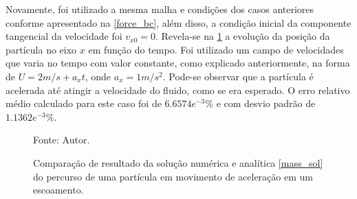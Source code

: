 Novamente, foi utilizado a mesma malha e condições dos casos anteriores conforme apresentado na \ref{force_bc}, além disso, a condição inicial da componente tangencial da velocidade foi $v_{x0}=0$.
Revela-se na \ref{mass_comp} a evolução da posição da partícula no eixo $x$ em função do tempo.
Foi utilizado um campo de velocidades que varia no tempo com valor constante, como explicado anteriormente, na forma de $U=2m/s+a_x t$, onde $a_x=1m/s^2$.
Pode-se observar que a partícula é acelerada até atingir a velocidade do fluido, como se era esperado.
O erro relativo médio calculado para este caso foi de $6.6574e^{-3}\%$ e com desvio padrão de $1.1362e^{-3}\%$.
\begin{figure}[H]
    \centering
     {\raggedleft \scriptsize Fonte: Autor.}
    \caption{Comparação de resultado da solução numérica e analítica \ref{mass_sol} do percurso de uma partícula em movimento de aceleração em um escoamento.}
    \label{mass_comp}
\end{figure}